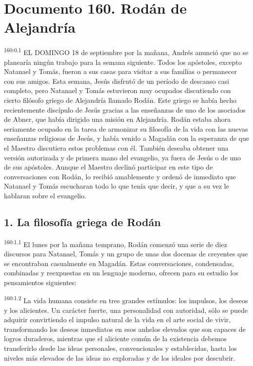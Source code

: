 \chapter{Documento 160. Rodán de Alejandría}
\par 
\textsuperscript{160:0.1} EL DOMINGO 18 de septiembre por la mañana, Andrés anunció que no se planearía ningún trabajo para la semana siguiente. Todos los apóstoles, excepto Natanael y Tomás, fueron a sus casas para visitar a sus familias o permanecer con sus amigos. Esta semana, Jesús disfrutó de un período de descanso casi completo, pero Natanael y Tomás estuvieron muy ocupados discutiendo con cierto filósofo griego de Alejandría llamado Rodán. Este griego se había hecho recientemente discípulo de Jesús gracias a las enseñanzas de uno de los asociados de Abner, que había dirigido una misión en Alejandría. Rodán estaba ahora seriamente ocupado en la tarea de armonizar su filosofía de la vida con las nuevas enseñanzas religiosas de Jesús, y había venido a Magadán con la esperanza de que el Maestro discutiera estos problemas con él. También deseaba obtener una versión autorizada y de primera mano del evangelio, ya fuera de Jesús o de uno de sus apóstoles. Aunque el Maestro declinó participar en este tipo de conversaciones con Rodán, lo recibió amablemente y ordenó de inmediato que Natanael y Tomás escucharan todo lo que tenía que decir, y que a su vez le hablaran sobre el evangelio.

\section*{1. La filosofía griega de Rodán}
\par 
\textsuperscript{160:1.1} El lunes por la mañana temprano, Rodán comenzó una serie de diez discursos para Natanael, Tomás y un grupo de unas dos docenas de creyentes que se encontraban casualmente en Magadán. Estas conversaciones, condensadas, combinadas y reexpuestas en un lenguaje moderno, ofrecen para su estudio los pensamientos siguientes:

\par 
\textsuperscript{160:1.2} La vida humana consiste en tres grandes estímulos: los impulsos, los deseos y los alicientes. Un carácter fuerte, una personalidad con autoridad, sólo se puede adquirir convirtiendo el impulso natural de la vida en el arte social de vivir, transformando los deseos inmediatos en esos anhelos elevados que son capaces de logros duraderos, mientras que el aliciente común de la existencia debemos transferirlo desde las ideas personales, convencionales y establecidas, hasta los niveles más elevados de las ideas no exploradas y de los ideales por descubrir.

